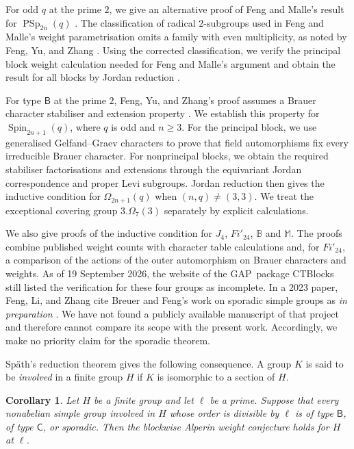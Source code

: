 \documentclass[10pt]{amsart}
\newtheorem{corollary}[theorem]{Corollary}
\theoremstyle{definition}
\renewcommand{\geq}{\geqslant}
\DeclareMathOperator{\PSp}{PSp}
\newcommand{\Baby}{\mathbb B}
\newcommand{\Monster}{\mathbb M}
\newcommand{\GAP}{\textsf{GAP}}
\numberwithin{equation}{section}
\numberwithin{table}{section}
\begin{document}
For odd $q$ at the prime $2$, we give an alternative proof of Feng and
Malle's result for $\PSp_{2n}(q)$ \cite[Theorem~1]{FengMalle2022}.
The classification of radical $2$-subgroups \cite[p.~190]{An1993}
used in Feng and Malle's weight parametrisation omits a family with even
multiplicity, as noted by Feng, Yu, and Zhang
\cite[Remark~3.36]{FengYuZhang2024}. Using the corrected classification,
we verify the principal block weight calculation needed for Feng and
Malle's argument and obtain the result for all blocks by Jordan reduction
\cite{FengLiZhang2022Jordan}.

For type $\mathsf B$ at the prime $2$, Feng, Yu, and Zhang's proof
assumes a Brauer character stabiliser and extension property
\cite[Theorem~1 and Assumption~5.1]{FengYuZhang2024}. We establish this
property for $\operatorname{Spin}_{2n+1}(q)$, where $q$ is odd and
$n\geq3$. For the principal block, we use generalised Gelfand--Graev
characters to prove that field automorphisms fix every irreducible Brauer
character. For nonprincipal blocks, we obtain the required stabiliser
factorisations and extensions through the equivariant Jordan
correspondence and proper Levi subgroups. Jordan reduction then gives the
inductive condition for $\Omega_{2n+1}(q)$ when $(n,q)\neq(3,3)$.
We treat the exceptional covering group $3.\Omega_7(3)$ separately by
explicit calculations.

We also give proofs of the inductive condition for $J_4$, $Fi'_{24}$,
$\Baby$ and $\Monster$. The proofs combine published weight counts
with character table calculations and, for $Fi'_{24}$, a comparison of
the actions of the outer automorphism on Brauer characters and weights.
As of 19 September 2026, the website of the \GAP~package CTBlocks
\cite{BreuerSporadicOverview} still listed the verification for these
four groups as incomplete. In a 2023 paper, Feng, Li, and Zhang cite
Breuer and Feng's work on sporadic simple groups as \emph{in preparation}
\cite[p.~6518]{FengLiZhang2023Morita}.
We have not found a publicly available manuscript of that project and
therefore cannot compare its scope with the present work. Accordingly,
we make no priority claim for the sporadic theorem.

Sp\"ath's reduction theorem \cite[Theorem~A]{Spath2013} gives the following
consequence.  A group $K$ is said to be \emph{involved} in a finite group
$H$ if $K$ is isomorphic to a section of $H$.

\begin{corollary}\label{cor:reduction}
Let $H$ be a finite group and let $\ell$ be a prime.  Suppose that every
nonabelian simple group involved in $H$ whose order is divisible by $\ell$
is of type $\mathsf B$, of type $\mathsf C$, or sporadic.  Then the blockwise
Alperin weight conjecture holds for $H$ at $\ell$.
\end{corollary}
\end{document}
